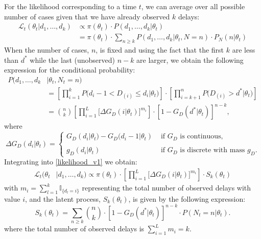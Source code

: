 \documentclass[12pt]{article}
\begin{document}
For the likelihood corresponding to a time $t$, we can average over all possible number of cases given that we have already observed $k$ delays:
\begin{equation}\label{likelihood_v1}
    \begin{aligned}
    \mathcal{L}_t(\theta_t  | d_1, \dots, d_ {k})  
    &\propto \pi(\theta_t)\cdot P(d_1, \dots, d_{k} | \theta_t)\\    
    & = \pi(\theta_t)\cdot \sum\limits_{n \geq k} P(d_1, \dots, d_{k} |\theta_t, N = n) \cdot P_N(n | \theta_t)   
    \end{aligned}
\end{equation}
When the number of cases, $n$, is fixed and using the fact that the first $k$ are less than $d^*$ while the last (unobserved) $n - k$ are larger, we obtain the following expression for the conditional probability:
\begin{equation}\label{gooddelay}
    \begin{aligned}
    P(d_1, \dots, d_{k} & |\theta_t, N_t = n)  
    \\ &= \left[ \prod\limits_{i=1}^k P\big(d_i - 1 < D_{(i)} \leq d_i|\theta_t\big)\right] \cdot \left[ \prod\limits_{i=k+1}^n P\big(D_{(i)} > d^{*}|\theta_t\big)\right] 
    \\ & = \binom{n}{k}\left[ \prod\limits_{i=1}^L \big[\Delta G_D(i|\theta_t)\big]^{m_i} \right] \cdot  \left[1 - G_D(d^*|\theta_t)\right]^{n-k},
    \end{aligned}
\end{equation}
where
\begin{equation}
    \Delta G_D(d_i|\theta_t) = \begin{cases}
        G_D(d_i|\theta_t) - G_D\big(d_i - 1|\theta_t) & \text{ if } G_{D} \text{ is continuous},\\\\
        g_D(d_i|\theta_t)  & \text{ if } G_{D} \text{ is discrete with mass } g_{D}.
    \end{cases}
\end{equation}
Integrating into \eqref{likelihood_v1} we obtain:
\begin{equation}\label{eq2}
    \begin{aligned}
    \mathcal{L}_t(\theta_t & | d_1, \dots, d_{k})  \propto   \pi(\theta_t) \cdot\left[ \prod\limits_{i=1}^L \big[\Delta G_D(i|\theta_t)\big]^{m_i} \right]\cdot  S_k(\theta_t)
    \end{aligned}
\end{equation}
with $m_i = \sum_{l=1}^k \mathbb{I}_{\{d_l = i\}}$ representing the total number of observed delays with value $i$, and the latent process, $S_k(\theta_t)$, is given by the following expression:
\begin{equation}\label{snk}
    S_k(\theta_t) = \sum\limits_{n \geq k} \binom{n}{k}   \cdot \left[1 - G_D(d^*|\theta_t)\right]^{n - k} \cdot P(N_t = n|\theta_t).
\end{equation}
where the total number of observed delays is $\sum_{i=1}^L m_i = k$. 
\end{document}
